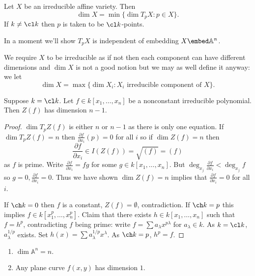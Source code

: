 \documentclass[a4paper]{article}
\renewcommand{\A}{\mathbb{A}}
\begin{document}
\begin{definition}[dimension]
  Let \(X\) be an irreducible affine variety. Then
  \[
    \dim X = \min \{\dim T_pX: p \in X\}.
  \]
  If \(k \neq \cl k\) then \(p\) is taken to be \(\cl k\)-points.
\end{definition}

In a moment we'll show \(T_pX\) is independent of embedding \(X \embed \A^n\).

We require \(X\) to be irreducible as if not then each component can have different dimensions and \(\dim X\) is not a good notion but we may as well define it anyway: we let
\[
  \dim X = \max \{\dim X_i: X_i \text{ irreducible component of } X\}.
\]

\begin{lemma}
  Suppose \(k = \cl k\). Let \(f \in k[x_1, \dots, x_n]\) be a nonconstant irreducible polynomial. Then \(Z(f)\) has dimension \(n - 1\).
\end{lemma}

\begin{proof}
  \(\dim T_p Z(f)\) is either \(n\) or \(n - 1\) as there is only one equation. If \(\dim T_pZ(f) = n\) then \(\frac{\partial f}{\partial x_i}(p) = 0\) for all \(i\) so if \(\dim Z(f) = n\) then
  \[
    \frac{\partial f}{\partial x_i} \in I(Z(f)) = \sqrt{(f)} = (f)
  \]
  as \(f\) is prime. Write \(\frac{\partial f}{\partial x_i} = fg\) for some \(g \in k[x_1, \dots, x_n]\). But \(\deg_{x_j} \frac{\partial f}{\partial x_i} < \deg_{x_j} f\) so \(g = 0, \frac{\partial f}{\partial x_i} = 0\). Thus we have shown \(\dim Z(f) = n\) implies that \(\frac{\partial f}{\partial x_i} = 0\) for all \(i\).

  If \(\ch k = 0\) then \(f\) is a constant, \(Z(f) = \emptyset\), contradiction. If \(\ch k = p\) this implies \(f \in k[x_1^p, \dots, x_n^p]\). Claim that there exists \(h \in k[x_1, \dots, x_n]\) such that \(f = h^p\), contradicting \(f\) being prime: write \(f = \sum a_\lambda x^{p \lambda}\) for \(a_\lambda \in k\). As \(k = \cl k\), \(a_\lambda^{1/p}\) exists. Set \(h(x) = \sum a_\lambda^{1/p} x^\lambda\). As \(\ch k = p\), \(h^p = f\).
\end{proof}

\begin{eg}\leavevmode
  \begin{enumerate}
  \item \(\dim \A^n = n\).
  \item Any plane curve \(f(x, y)\) has dimension \(1\).
  \end{enumerate}
\end{eg}
\end{document}
